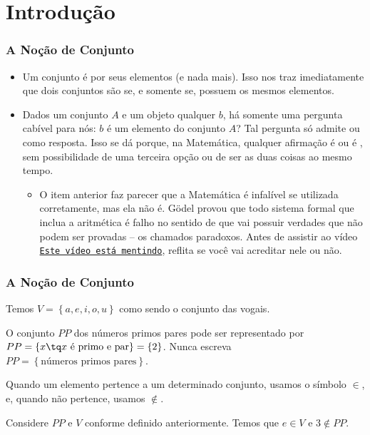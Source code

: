 \section{Introdução}


\begin{frame}
    \frametitle{A Noção de Conjunto}
    
    \begin{itemize}
        \item<1->
        Um conjunto é  por seus elementos (e nada mais). Isso nos traz imediatamente que dois conjuntos são  se, e somente se, possuem os mesmos elementos.

        \item<2->
        Dados um conjunto $A$ e um objeto qualquer $b$, há somente uma pergunta cabível para nós: $b$ é um elemento do conjunto $A$? Tal pergunta só admite  ou  como resposta. Isso se dá porque, na Matemática, qualquer afirmação é  ou é , sem possibilidade de uma terceira opção ou de ser as duas coisas ao mesmo tempo.
        \begin{itemize}
            \item<3-> O item anterior faz parecer que a Matemática é infalível se utilizada corretamente, mas ela não é. Gödel provou que todo sistema formal que inclua a aritmética é falho no sentido de que vai possuir verdades que não podem ser provadas -- os chamados paradoxos.  Antes de assistir ao vídeo \href{https://youtu.be/UI1xR_AECrU}{{\tt Este vídeo está mentindo}}, reflita se você vai acreditar nele ou não.
        \end{itemize}
    \end{itemize}
\end{frame}


\begin{frame}
    \frametitle{A Noção de Conjunto}

    \begin{Exem}
        Temos $V = \left\{a, e, i, o, u \right\}$ como sendo o conjunto das vogais.
    \end{Exem}

    \begin{Exem}
        O conjunto $PP$ dos números primos pares pode ser representado por $PP = \left\{ x \tq x \text{ é primo e par} \right\} = \left\{ 2 \right\}$. Nunca escreva $PP = \left\{ \text{números primos pares} \right\}$.
    \end{Exem}
    
    Quando um elemento pertence a um determinado conjunto, usamos o símbolo $\in$, e, quando não pertence, usamos $\notin$.
	
    \begin{Exem}
        Considere $PP$ e $V$ conforme definido anteriormente. Temos que $e \in V$ e $3 \notin PP$.
    \end{Exem}
\end{frame}


